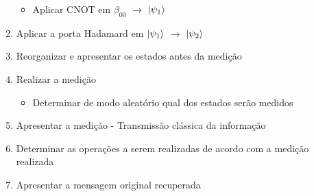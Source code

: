 \begin{enumerate}
\begin{itemize}
	\item Aplicar CNOT em $\beta _00$ $\rightarrow$ $\ket{\psi _1}$
	\end{itemize}
\item Aplicar a porta Hadamard em $\ket{\psi _1}$ $\rightarrow$ $\ket{\psi _2}$
\item Reorganizar e apresentar os estados antes da medição
\item Realizar a medição
	\begin{itemize}
	\item Determinar de modo aleatório qual dos estados serão medidos
	\end{itemize}
\item Apresentar a medição - Transmissão clássica da informação
\item Determinar as operações a serem realizadas de acordo com a medição realizada
\item Apresentar a mensagem original recuperada
\end{enumerate}

